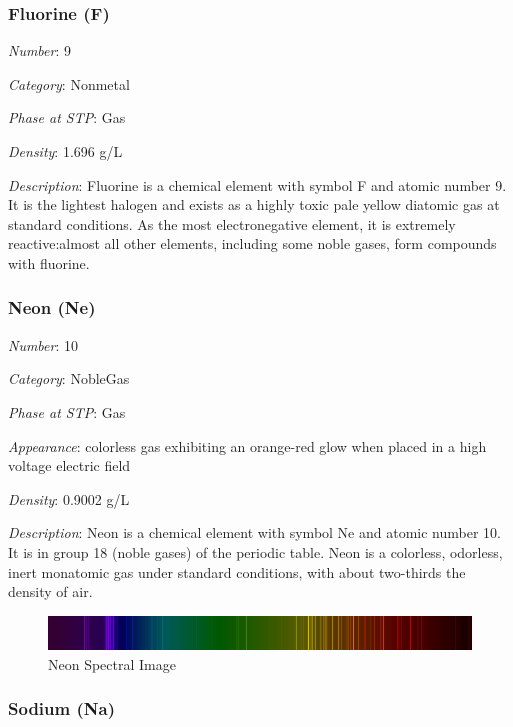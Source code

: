 \documentclass{article}
\begin{document}
\hypertarget{subsubsection::F}{}\subsubsection{Fluorine (F)}

\textit{Number}: 9

\textit{Category}: Nonmetal

\textit{Phase at STP}: Gas

\textit{Density}: 1.696 g/L

\textit{Description}: Fluorine is a chemical element with symbol F and atomic number 9. It is the lightest halogen and exists as a highly toxic pale yellow diatomic gas at standard conditions. As the most electronegative element, it is extremely reactive:almost all other elements, including some noble gases, form compounds with fluorine.

\hypertarget{subsubsection::Ne}{}\subsubsection{Neon (Ne)}

\textit{Number}: 10

\textit{Category}: NobleGas

\textit{Phase at STP}: Gas

\textit{Appearance}: colorless gas exhibiting an orange-red glow when placed in a high voltage electric field

\textit{Density}: 0.9002 g/L

\textit{Description}: Neon is a chemical element with symbol Ne and atomic number 10. It is in group 18 (noble gases) of the periodic table. Neon is a colorless, odorless, inert monatomic gas under standard conditions, with about two-thirds the density of air.

\immediate{}
\begin{figure}[!ht]
    \centering
    \includegraphics[width=12cm]{./resources/spectral_img/Neon_spectra.jpg}
    \caption{Neon Spectral Image}
\end{figure}

\hypertarget{subsubsection::Na}{}\subsubsection{Sodium (Na)}
\end{document}
